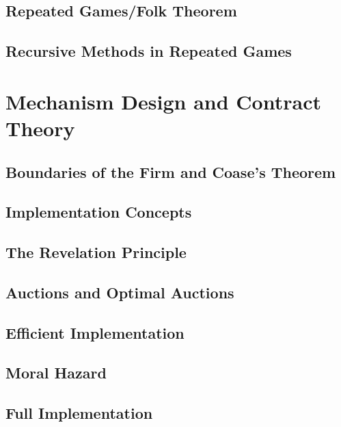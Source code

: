 \documentclass[12pt,openany]{report}
\theoremstyle{definition}
\begin{document}
\chapter{Repeated Games/Folk Theorem}

\chapter{Recursive Methods in Repeated Games}

\part{Mechanism Design and Contract Theory}

\chapter{Boundaries of the Firm and Coase's Theorem}

\chapter{Implementation Concepts}

\chapter{The Revelation Principle}

\chapter{Auctions and Optimal Auctions}

\chapter{Efficient Implementation}

\chapter{Moral Hazard}

\chapter{Full Implementation}

\newpage


\end{document}
